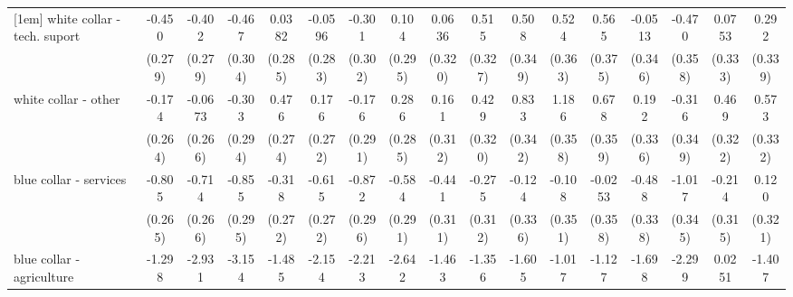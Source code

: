 {\begin{tabular}{l*{16}{c}}
[1em]
white collar - tech. suport&      -0.450         &      -0.402         &      -0.467         &      0.0382         &     -0.0596         &      -0.301         &       0.104         &      0.0636         &       0.515         &       0.508         &       0.524         &       0.565         &     -0.0513         &      -0.470         &      0.0753         &       0.292         \\
                    &     (0.279)         &     (0.279)         &     (0.304)         &     (0.285)         &     (0.283)         &     (0.302)         &     (0.295)         &     (0.320)         &     (0.327)         &     (0.349)         &     (0.363)         &     (0.375)         &     (0.346)         &     (0.358)         &     (0.333)         &     (0.339)         \\
[1em]
white collar - other&      -0.174         &     -0.0673         &      -0.303         &       0.476         &       0.176         &      -0.176         &       0.286         &       0.161         &       0.429         &       0.833\sym{*}  &       1.186\sym{***}&       0.678         &       0.192         &      -0.316         &       0.469         &       0.573         \\
                    &     (0.264)         &     (0.266)         &     (0.294)         &     (0.274)         &     (0.272)         &     (0.291)         &     (0.285)         &     (0.312)         &     (0.320)         &     (0.342)         &     (0.358)         &     (0.359)         &     (0.336)         &     (0.349)         &     (0.322)         &     (0.332)         \\
[1em]
blue collar - services&      -0.805\sym{**} &      -0.714\sym{**} &      -0.855\sym{**} &      -0.318         &      -0.615\sym{*}  &      -0.872\sym{**} &      -0.584\sym{*}  &      -0.441         &      -0.275         &      -0.124         &      -0.108         &     -0.0253         &      -0.488         &      -1.017\sym{**} &      -0.214         &       0.120         \\
                    &     (0.265)         &     (0.266)         &     (0.295)         &     (0.272)         &     (0.272)         &     (0.296)         &     (0.291)         &     (0.311)         &     (0.312)         &     (0.336)         &     (0.351)         &     (0.358)         &     (0.338)         &     (0.345)         &     (0.315)         &     (0.321)         \\
[1em]
blue collar - agriculture&      -1.298         &      -2.931\sym{***}&      -3.154\sym{**} &      -1.485         &      -2.154\sym{*}  &      -2.213\sym{**} &      -2.642\sym{**} &      -1.463         &      -1.356         &      -1.605\sym{*}  &      -1.017         &      -1.127         &      -1.698         &      -2.299\sym{**} &      0.0251         &      -1.407\sym{*}  \\

\end{tabular}}
